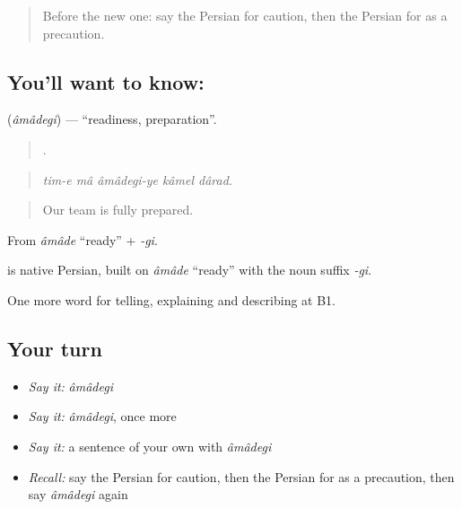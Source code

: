 \label{lesson:FA-C397-amadegi}



\begin{quote}
Before the new one: say the Persian for caution, then the Persian for as a precaution.
\end{quote}

\subsection*{You'll want to know: }
\textbf{} (\emph{âmâdegi}) — \textquotedblleft{}readiness, preparation\textquotedblright{}.

\begin{quote}
    .
\end{quote}

\begin{quote}
\emph{tim-e mâ âmâdegi-ye kâmel dârad.}
\end{quote}

\begin{quote}
Our team is fully prepared.
\end{quote}

From \emph{âmâde} \textquotedblleft{}ready\textquotedblright{} + \emph{-gi}.

\begin{cousinweb}
\textbf{} is native Persian, built on \emph{âmâde} \textquotedblleft{}ready\textquotedblright{} with the noun suffix \emph{-gi}.
\end{cousinweb}

\begin{grammarlens}[title={What you've built}]
One more word for telling, explaining and describing at B1.
\end{grammarlens}

\subsection*{Your turn}
\begin{itemize}
\raggedright
  \item \emph{Say it:} \emph{âmâdegi}
  \item \emph{Say it:} \emph{âmâdegi}, once more
  \item \emph{Say it:} a sentence of your own with \emph{âmâdegi}
  \item \emph{Recall:} say the Persian for caution, then the Persian for as a precaution, then say \emph{âmâdegi} again
\end{itemize}

